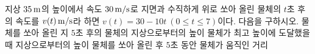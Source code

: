 지상 $35\mkern3mu \mathrm{m}$의 높이에서 속도 $30\mkern3mu \mathrm{m/s}$로 지면과 수직하게 위로 쏘아 올린 물체의 $t$초 후의 속도를 $v(t)\mkern3mu \mathrm{m/s}$라 하면 $v(t)=30-10t\ (0\le t\le 7)$이다. 다음을 구하시오.
 물체를 쏘아 올린 지 $5$초 후의 물체의 지상으로부터의 높이
 물체가 최고 높이에 도달했을 때 지상으로부터의 높이
 물체를 쏘아 올린 후 $5$초 동안 물체가 움직인 거리
